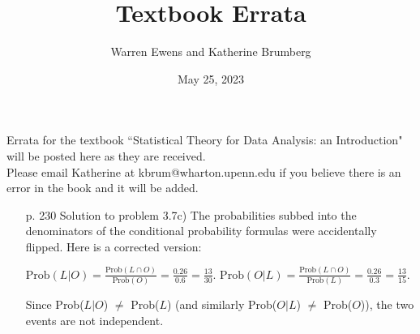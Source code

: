 \documentclass{article}
\title{Textbook Errata}
\author{Warren Ewens and Katherine Brumberg}
\date{May 25, 2023}
\begin{document}
\maketitle

\noindent Errata for the textbook ``Statistical Theory for Data Analysis: an Introduction" will be posted here as they are received. \\

\noindent Please email Katherine at kbrum@wharton.upenn.edu if you believe there is an error in the book and it will be added.


\begin{enumerate}
\item[p. 230]  Solution to problem 3.7c) The probabilities subbed into the denominators of the conditional probability formulas were accidentally flipped. Here is a corrected version:

$\text{Prob}(L | O) = \frac{\text{Prob}(L\cap O)}{\text{Prob}(O)} = \frac{0.26}{0.6} = \frac{13}{30}.$
$\text{Prob}(O | L) = \frac{\text{Prob}(L\cap O)}{\text{Prob}(L)} = \frac{0.26}{0.3} =  \frac{13}{15}.$\smallskip

Since Prob($L | O$) $\neq$ Prob($L$) (and similarly Prob($O | L$) $\neq$ Prob($O$)), the two events are not independent.
\end{enumerate}
\end{document}
